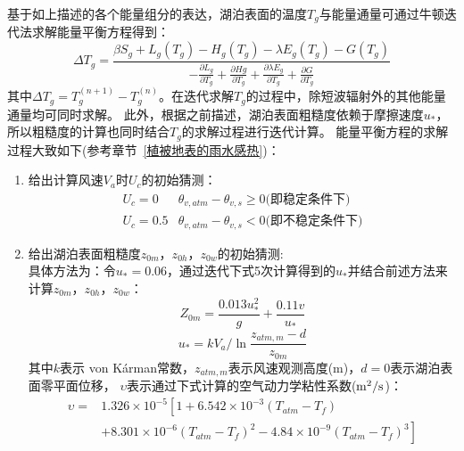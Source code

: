 基于如上描述的各个能量组分的表达，湖泊表面的温度$T_g$与能量通量可通过牛顿迭代法求解能量平衡方程得到：
\begin{equation}
\Delta T_{g}=\frac{\beta S_{g}+L_{g}\left(T_{g}\right)-H_{g}\left(T_{g}\right)
-\lambda E_{g}\left(T_{g}\right)-G\left(T_{g}\right)}{-\frac{\partial L_{g}}{\partial T_{g}}
+\frac{\partial H g}{\partial T_{g}}+\frac{\partial \lambda E_{g}}{\partial T_{g}}+\frac{\partial G}{\partial T_{g}}}
\end{equation}
其中$\Delta T_g=T_g^{\left(n+1\right)}-T_g^{\left(n\right)}$。在迭代求解$T_g$的过程中，除短波辐射外的其他能量通量均可同时求解。
此外，根据之前描述，湖泊表面粗糙度依赖于摩擦速度$u_\ast$，所以粗糙度的计算也同时结合$T_g$的求解过程进行迭代计算。
能量平衡方程的求解过程大致如下(参考章节~\ref{植被地表的雨水感热})：
\begin{enumerate}
    \item 给出计算风速$V_a$时$U_c$的初始猜测：
        \begin{equation}
        \begin{array}{ll}
            U_{c}=0 & \theta_{v, atm}-\theta_{v, s} \geq 0 \text{(即稳定条件下)} \\
            U_{c}=0.5 & \theta_{v, atm}-\theta_{v, s}<0 \text{(即不稳定条件下)}
        \end{array}
        \end{equation}
    \item 给出湖泊表面粗糙度$z_{0m}$，$z_{0h}$，$z_{0w}$的初始猜测:\\
        具体方法为：令$u_\ast=0.06$，通过迭代下式5次计算得到的$u_\ast$并结合前述方法来计算$z_{0m}$，$z_{0h}$，$z_{0w}$：
        \begin{equation}
        Z_{0 m}=\frac{0.013 u_{*}^{2}}{g}+\frac{0.11 v}{u_{*}}
        \end{equation}
        \begin{equation}
        u_{*}=k V_{a} / \ln \frac{z_{atm, m}-d}{z_{0 m}}
        \end{equation}
        其中$k$表示 von K\'arman常数，$z_{atm,m}$表示风速观测高度(m)，$d=0$表示湖泊表面零平面位移，
        $\upsilon$表示通过下式计算的空气动力学粘性系数($\rm m^2/s$)\citep{andreas1989thermal}：
        \begin{equation}
            \begin{array}{cl}
            \upsilon=&1.326\times{10}^{-5}\left[1+6.542\times{10}^{-3}\left(T_{atm}-T_f\right)\right.\\
                           & \left. +8.301\times{10}^{-6}\left(T_{atm}-T_f\right)^2-4.84\times{10}^{-9}\left(T_{atm}-T_f\right)^3\right]

\end{array}
\end{equation}
\end{enumerate}
